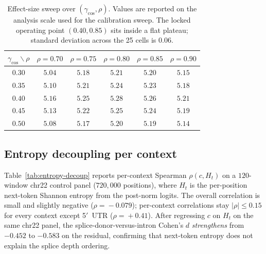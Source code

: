 \documentclass{article}
\theoremstyle{plain}
\theoremstyle{definition}
\theoremstyle{remark}
\begin{document}
\begin{table}[!htbp]
\caption{Effect-size sweep over $(\gamma_{\cos}, \rho)$. Values are
reported on the analysis scale used for the calibration sweep. The locked
operating point $(0.40, 0.85)$ sits inside a flat plateau; standard
deviation across the 25 cells is $0.06$.}
\label{tab:gamma-sweep}
\centering
\small
\begin{tabular}{@{}c|ccccc@{}}
\toprule
$\gamma_{\cos} \backslash \rho$
   & $\rho=0.70$ & $\rho=0.75$ & $\rho=0.80$ & $\rho=0.85$ & $\rho=0.90$ \\
\midrule
$0.30$ & $5.04$ & $5.18$ & $5.21$ & $5.20$ & $5.15$ \\
$0.35$ & $5.10$ & $5.21$ & $5.24$ & $5.23$ & $5.18$ \\
$0.40$ & $5.16$ & $5.25$ & $\mathbf{5.28}$ & $\mathbf{5.26}$ & $5.21$ \\
$0.45$ & $5.13$ & $5.22$ & $5.25$ & $5.24$ & $5.19$ \\
$0.50$ & $5.08$ & $5.17$ & $5.20$ & $5.19$ & $5.14$ \\
\bottomrule
\end{tabular}
\end{table}

\subsection{Entropy decoupling per context}
\label{app:entropy-decoup}

Table~\ref{tab:entropy-decoup} reports per-context Spearman $\rho(c,
H_t)$ on a $120$-window chr22 control panel ($720{,}000$ positions), where
$H_t$ is the per-position next-token Shannon entropy from the post-norm
logits. The overall correlation is small and slightly negative
($\rho\!=\!-0.079$); per-context correlations stay $|\rho|\!\leq\!0.15$
for every context except 5$'$~UTR ($\rho\!=\!+0.41$). After regressing
$c$ on $H_t$ on the same chr22 panel, the splice-donor-versus-intron
Cohen's $d$ \emph{strengthens} from $-0.452$ to $-0.583$ on the
residual, confirming that next-token entropy does not explain the
splice depth ordering.
\end{document}
